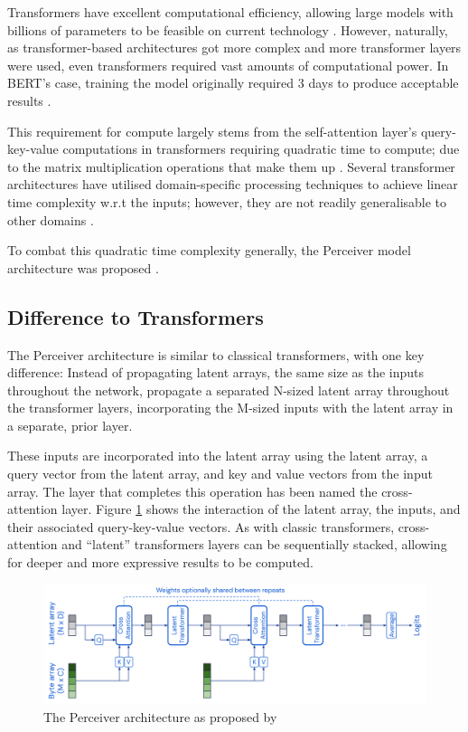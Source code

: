 \documentclass{l4proj}
\begin{document}
Transformers have excellent computational efficiency, allowing large models with billions of parameters to be feasible on current technology \citep{dosovitskiy2020image}. However, naturally, as transformer-based architectures got more complex and more transformer layers were used, even transformers required vast amounts of computational power. In BERT’s case, training the model originally required 3 days to produce acceptable results \citep{you2019reducing}.

This requirement for compute largely stems from the self-attention layer’s query-key-value computations in transformers requiring quadratic time to compute; due to the matrix multiplication operations that make them up \citep{vaswani2017attention}. Several transformer architectures have utilised domain-specific processing techniques to achieve linear time complexity w.r.t the inputs; however, they are not readily generalisable to other domains \citep{perceiver}.

To combat this quadratic time complexity generally, the Perceiver model architecture was proposed \citep{perceiver}.

	\subsection{Difference to Transformers}

The Perceiver architecture is similar to classical transformers, with one key difference: Instead of propagating latent arrays, the same size as the inputs throughout the network, propagate a separated N-sized latent array throughout the transformer layers, incorporating the M-sized inputs with the latent array in a separate, prior layer.

These inputs are incorporated into the latent array using the latent array, a query vector from the latent array, and key and value vectors from the input array. The layer that completes this operation has been named the cross-attention layer. Figure \ref{fig:perceiver} shows the interaction of the latent array, the inputs, and their associated query-key-value vectors. As with classic transformers, cross-attention and “latent” transformers layers can be sequentially stacked, allowing for deeper and more expressive results to be computed.

\begin{figure}[htb]
    \centering
    \includegraphics[width=0.75\linewidth]{images/perceiver_architecture.png}  

    \caption{The Perceiver architecture as proposed by \cite{perceiver}}

    \label{fig:perceiver} 
\end{figure}
\end{document}
